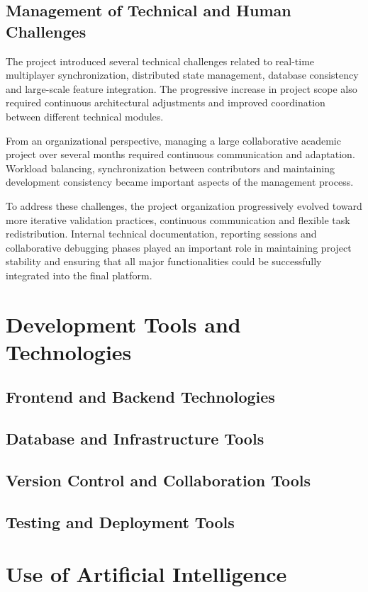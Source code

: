 \documentclass[11pt,a4paper]{article}
\begin{document}
\subsection{Management of Technical and Human Challenges}

The project introduced several technical challenges related to real-time multiplayer synchronization, distributed state management, database consistency and large-scale feature integration. The progressive increase in project scope also required continuous architectural adjustments and improved coordination between different technical modules.

From an organizational perspective, managing a large collaborative academic project over several months required continuous communication and adaptation. Workload balancing, synchronization between contributors and maintaining development consistency became important aspects of the management process.

To address these challenges, the project organization progressively evolved toward more iterative validation practices, continuous communication and flexible task redistribution. Internal technical documentation, reporting sessions and collaborative debugging phases played an important role in maintaining project stability and ensuring that all major functionalities could be successfully integrated into the final platform.
\newpage
\section{Development Tools and Technologies}
\subsection{Frontend and Backend Technologies}
\subsection{Database and Infrastructure Tools}
\subsection{Version Control and Collaboration Tools}
\subsection{Testing and Deployment Tools}
\newpage
\section{Use of Artificial Intelligence}
\end{document}
